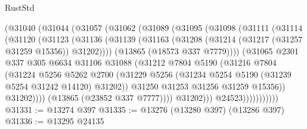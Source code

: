 \begin{lexlean}{RustStd}
\begin{coremodule}
                    (@31040
                      (@31044
                        (@31057
                          (@31062
                            (@31089
                              (@31095
                                (@31098
                                  (@31111
                                    (@31114
                                      (@31120
                                        (@31123
                                          (@31136
                                            (@31139
                                              (@31163
                                                (@31208
                                                  (@31214 (@31217 (@31257 @31259 @15356)) @31202))))
                                            (@13865 (@18573 @337 @7779))))
                                        (@31065
                                          @2301
                                          @337
                                          @305
                                          @6634
                                          @31106
                                          @31088
                                          (@31212
                                            @7804
                                            @5190
                                            (@31216
                                              @7804
                                              (@31224
                                                @5256
                                                @5262
                                                @2700
                                                (@31229
                                                  @5256
                                                  (@31234
                                                    @5254
                                                    @5190
                                                    (@31239 @5254 @31242 @14120)
                                                    @31202))
                                                @31250
                                                @31253
                                                @31256
                                                @31259
                                                @15356))
                                            @31202))))
                                    (@13865 (@23852 @337 @7777))))
                                @31202)))
                          @24523)))))))))))
@31331 := @13274 @397
@31335 := @13276 (@13280 @397) (@13286 @397)
@31336 := @13295 @24135

\end{coremodule}
\end{lexlean}
